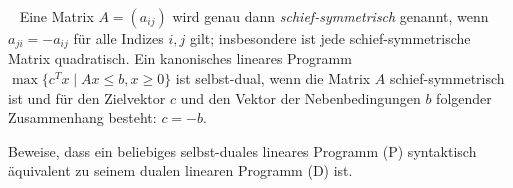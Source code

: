 \documentclass{uebung_cs}
\begin{document}
\begin{aufgabe}\
	Eine Matrix $A = (a_{ij})$ wird genau dann \emph{schief-symmetrisch} genannt, wenn $a_{ji} = -a_{ij}$ für alle Indizes $i, j$ gilt; insbesondere ist jede schief-symmetrische Matrix quadratisch. Ein kanonisches lineares Programm ${\max\{c^T x  \; | \; Ax \leq b, x \geq 0\}}$ ist selbst-dual, wenn die Matrix $A$ schief-symmetrisch ist und für den Zielvektor $c$ und den Vektor der Nebenbedingungen $b$ folgender Zusammenhang besteht: $c = -b$.
	
	Beweise, dass ein beliebiges selbst-duales lineares Programm (P) syntaktisch äquivalent zu seinem dualen linearen Programm (D) ist.
\end{aufgabe}
\end{document}
